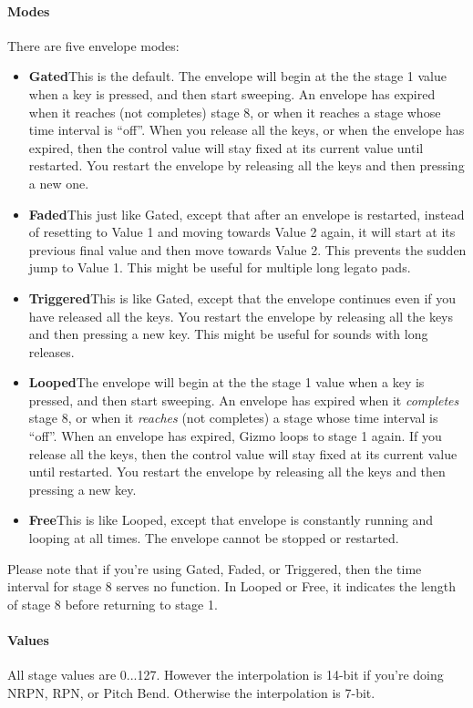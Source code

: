 \documentclass{article}
\begin{document}
\paragraph{Modes}  There are five envelope modes:

\begin{itemize}
\item {\bf Gated}\quad This is the default.  The envelope will begin at the the stage 1 value when a key is pressed, and then start sweeping.  An envelope has expired when it reaches (not completes) stage 8, or when it reaches a stage whose time interval is ``off''.  When you release all the keys, or when the envelope has expired, then the control value will stay fixed at its current value until restarted.  You restart the envelope by releasing all the keys and then pressing a new one. 
\item {\bf Faded}\quad This just like Gated, except that after an envelope is restarted, instead of resetting to Value 1 and moving towards Value 2 again, it will start at its previous final value and then move towards Value 2.  This prevents the sudden jump to Value 1.  This might be useful for multiple long legato pads.
\item {\bf Triggered}\quad This is like Gated, except that the envelope continues even if you have released all the keys.  You restart the envelope by releasing all the keys and then pressing a new key.  This might be useful for sounds with long releases.
\item {\bf Looped}\quad The envelope will begin at the the stage 1 value when a key is pressed, and then start sweeping.  An envelope has expired when it {\it completes} stage 8, or when it {\it reaches} (not completes) a stage whose time interval is ``off''.  When an envelope has expired, Gizmo loops to stage 1 again.  If you release all the keys, then the control value will stay fixed at its current value until restarted.  You restart the envelope by releasing all the keys and then pressing a new key.
\item {\bf Free}\quad This is like Looped, except that envelope is constantly running and looping at all times.  The envelope cannot be stopped or restarted.
\end{itemize}

Please note that if you're using Gated, Faded, or Triggered, then the time interval for stage 8 serves no function.  In Looped or Free, it indicates the length of stage 8 before returning to stage 1.  

\paragraph{Values}  All stage values are 0...127.  However the interpolation is 14-bit if you're doing NRPN, RPN, %
or Pitch Bend.  Otherwise the interpolation is 7-bit.
\end{document}
